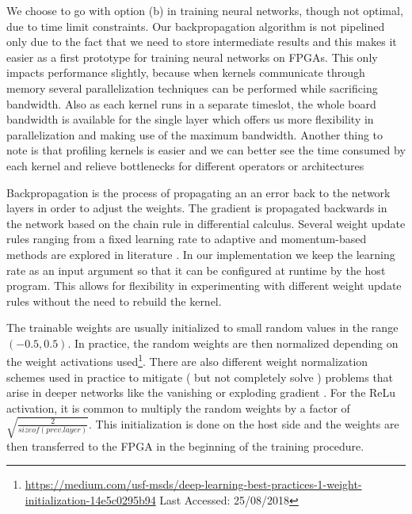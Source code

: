 We choose to go with option (b) in training neural networks, though not optimal, due to time limit constraints. Our backpropagation algorithm is not pipelined only due to the fact that we need to store intermediate results and this makes it easier as a first prototype for training neural networks on FPGAs. This only impacts performance slightly, because when kernels communicate through memory several parallelization techniques can be performed while sacrificing bandwidth. Also as each kernel runs in a separate timeslot, the whole board bandwidth is available for the single layer which offers us more flexibility in parallelization and making use of the maximum bandwidth. Another thing to note is that profiling kernels is easier and we can better see the time consumed by each kernel and relieve bottlenecks for different operators or architectures 

Backpropagation is the process of propagating an an error back to the network layers in order to adjust the weights. The gradient is propagated backwards in the network based on the chain rule in differential calculus. Several weight update rules ranging from a fixed learning rate to adaptive and momentum-based methods are explored in literature \cite{ddl}. In our implementation we keep the learning rate as an input argument so that it can be configured at runtime by the host program. This allows for flexibility in experimenting with different weight update rules without the need to rebuild the kernel.

The trainable weights are usually initialized to small random values in the range $ (-0.5,0.5) $. In practice, the random weights are then normalized depending on the weight activations used\footnote{\url{https://medium.com/usf-msds/deep-learning-best-practices-1-weight-initialization-14e5c0295b94} Last Accessed: 25/08/2018}. There are also different weight normalization schemes used in practice to mitigate ( but not completely solve ) problems that arise in deeper networks like the vanishing or exploding gradient \cite{hochreiter1998vanishing}. For the ReLu activation, it is common to multiply the random weights by a factor of $ \sqrt{\frac{2}{sizeof(prev. layer)}} $. This initialization is done on the host side and the weights are then transferred to the FPGA in the beginning of the training procedure. 


